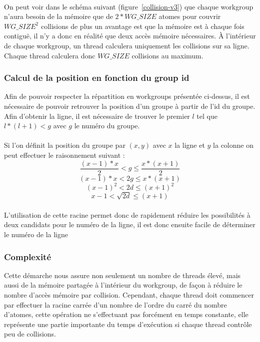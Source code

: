 \documentclass{article}
\begin{document}
\paragraph{}
On peut voir dans le schéma suivant (figure~\ref{collision-v3})
que chaque workgroup n'aura besoin de la mémoire
que de $2 * WG\_SIZE$ atomes pour couvrir $WG\_SIZE^2$ collisions de plus
un avantage est que la mémoire est à chaque fois contiguë, il n'y a donc en
réalité que deux accès mémoire nécessaires. À l'intérieur de chaque workgroup,
un thread calculera uniquement les collisions sur sa ligne. Chaque thread
calculera donc $WG\_SIZE$ collisions au maximum.
\subsubsection{Calcul de la position en fonction du group id}
Afin de pouvoir respecter la répartition en workgroups présentée ci-dessus, il
est nécessaire de pouvoir retrouver la position d'un groupe à partir de l'id du
groupe. Afin d'obtenir la ligne, il est nécessaire de trouver le premier $l$ tel
que $l* (l+1) < g$ avec $g$ le numéro du groupe.
\paragraph{}
Si l'on définit la position du groupe par $(x,y)$ avec $x$ la ligne et $y$ la
colonne on peut effectuer le raisonnement suivant :
$$\frac{(x-1) * x}{2} < g \leq \frac{x * (x+1)}{2}$$
$$(x-1) * x < 2g \leq x * (x+1)$$
$$(x-1)^2 < 2d \leq (x+1)^2$$
$$x-1 < \sqrt{2d} \leq (x+1)$$
\paragraph{}
L'utilisation de cette racine permet donc de rapidement réduire les possibilités
à deux candidats pour le numéro de la ligne, il est donc ensuite facile de
déterminer le numéro de la ligne

\subsubsection{Complexité}
Cette démarche nous assure non seulement un nombre de threads élevé, mais aussi
de la mémoire partagée à l'intérieur du workgroup, de façon à réduire le nombre
d'accès mémoire par collision. Cependant, chaque thread doit commencer par
effectuer la racine carrée d'un nombre de l'ordre du carré du nombre d'atomes,
cette opération ne s'effectuant pas forcément en temps constante, elle
représente une partie importante du temps d'exécution si chaque thread contrôle
peu de collisions.
\end{document}
